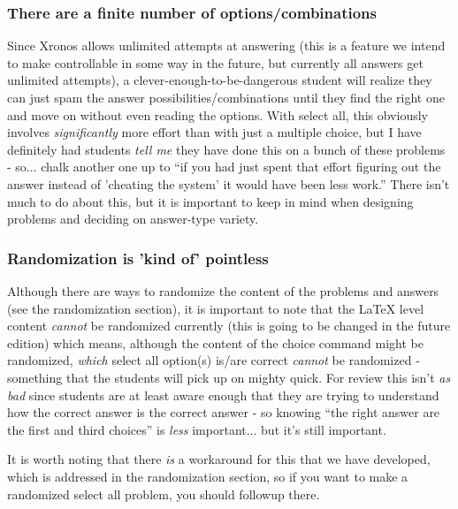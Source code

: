 \documentclass{ximera}
\begin{document}
    \subsubsection*{There are a finite number of options/combinations}
        Since Xronos allows unlimited attempts at answering (this is a feature we intend to make controllable in some way in the future, but currently all answers get unlimited attempts), a clever-enough-to-be-dangerous student will realize they can just spam the answer possibilities/combinations until they find the right one and move on without even reading the options. With select all, this obviously involves \textit{significantly} more effort than with just a multiple choice, but I have definitely had students \textit{tell me} they have done this on a bunch of these problems - so... chalk another one up to ``if you had just spent that effort figuring out the answer instead of 'cheating the system' it would have been less work.'' There isn't much to do about this, but it is important to keep in mind when designing problems and deciding on answer-type variety.
        
    \subsubsection*{Randomization is 'kind of' pointless}
        Although there are ways to randomize the content of the problems and answers (see the randomization section), it is important to note that the LaTeX level content \textit{cannot} be randomized currently (this is going to be changed in the future edition) which means, although the content of the choice command might be randomized, \textit{which} select all option(s) is/are correct \textit{cannot} be randomized - something that the students will pick up on mighty quick. For review this isn't \textit{as bad} since students are at least aware enough that they are trying to understand how the correct answer is the correct answer - so knowing ``the right answer are the first and third choices'' is \textit{less} important... but it's still important.
        
        It is worth noting that there \textit{is} a workaround for this that we have developed, which is addressed in the randomization section, so if you want to make a randomized select all problem, you should followup there.
        
        
\end{document}
